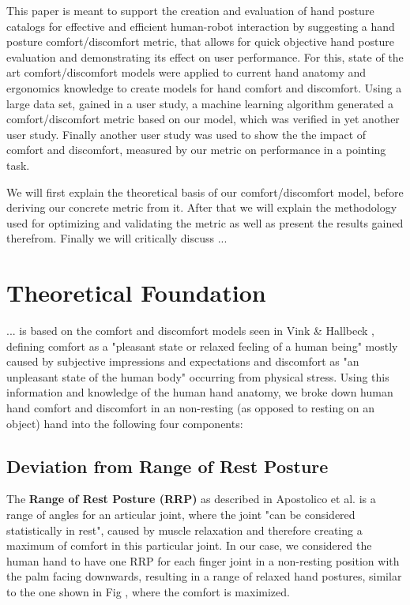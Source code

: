 \documentclass{sig-alternate-05-2015}
\begin{document}
This paper is meant to support the creation and evaluation of hand posture catalogs for effective and efficient human-robot interaction by suggesting a hand posture comfort/discomfort metric, that allows for quick objective hand posture evaluation and demonstrating its effect on user performance. For this, state of the art comfort/discomfort models were applied to current hand anatomy and ergonomics knowledge to create models for hand comfort and discomfort. Using a large data set, gained in a user study, a machine learning algorithm generated a comfort/discomfort metric based on our model, which was verified in yet another user study. Finally another user study was used to show the the impact of comfort and discomfort, measured by our metric on performance in a pointing task.

We will first explain the theoretical basis of our comfort/discomfort model, before deriving our concrete metric from it. After that we will explain the methodology used for optimizing and validating the metric as well as present the results gained therefrom. Finally we will critically discuss ...


\section{Theoretical Foundation}
... is based on the comfort and discomfort models seen in Vink \& Hallbeck \cite{vink2012editorial}, defining comfort as a "pleasant state or relaxed feeling of a human being" mostly caused by subjective impressions and expectations and discomfort as "an unpleasant state of the human body" occurring from physical stress. Using this information and knowledge of the human hand anatomy, we broke down human hand comfort and discomfort in an non-resting (as opposed to resting on an object) hand into the following four components:

\subsection{Deviation from Range of Rest Posture}

The \textbf{Range of Rest Posture (RRP)} as described in Apostolico et al. \cite{apostolico2014postural} is a range of angles for an articular joint, where the joint "can be considered statistically in rest", caused by muscle relaxation and therefore creating a maximum of comfort in this particular joint. In our case, we considered the human hand to have one RRP for each finger joint in a non-resting position with the palm facing downwards, resulting in a range of relaxed hand postures, similar to the one shown in Fig
, where the comfort is maximized. 
\end{document}
